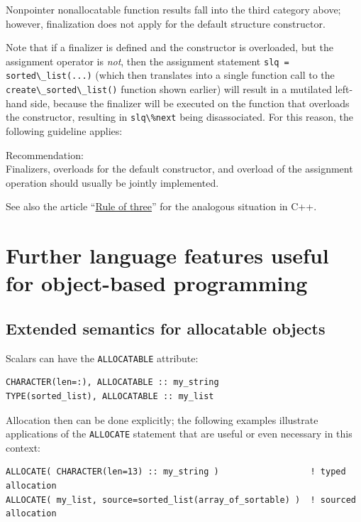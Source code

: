 \documentclass[
  paper=a4,
  ,captions=tableheading
]{scrartcl}
\newcommand{\passthrough}[1]{#1}
\renewenvironment{quote}{\begin{customblockquote}\list{}{\rightmargin=0em\leftmargin=0em}%
\item\relax\color{blockquote-text}\ignorespaces}{\unskip\unskip\endlist\end{customblockquote}}
\begin{document}
Nonpointer nonallocatable function results fall into the third category
above; however, finalization does not apply for the default structure
constructor.

Note that if a finalizer is defined and the constructor is overloaded,
but the assignment operator is \emph{not}, then the assignment statement
\passthrough{\lstinline!slq = sorted\_list(...)!} (which then translates
into a single function call to the
\passthrough{\lstinline!create\_sorted\_list()!} function shown earlier)
will result in a mutilated left-hand side, because the finalizer will be
executed on the function that overloads the constructor, resulting in
\passthrough{\lstinline!slq\%next!} being disassociated. For this
reason, the following guideline applies:

\begin{quote}
Recommendation:\\
Finalizers, overloads for the default constructor, and overload of the
assignment operation should usually be jointly implemented.
\end{quote}

See also the article
``\href{https://en.wikipedia.org/wiki/Rule_of_three_(C\%2B\%2B_programming)}{Rule
of three}'' for the analogous situation in C++.

\section{Further language features useful for object-based
programming}\label{further-language-features-useful-for-object-based-programming}

\subsection{Extended semantics for allocatable
objects}\label{extended-semantics-for-allocatable-objects}

Scalars can have the \passthrough{\lstinline!ALLOCATABLE!} attribute:

\begin{lstlisting}
CHARACTER(len=:), ALLOCATABLE :: my_string
TYPE(sorted_list), ALLOCATABLE :: my_list
\end{lstlisting}

Allocation then can be done explicitly; the following examples
illustrate applications of the \passthrough{\lstinline!ALLOCATE!}
statement that are useful or even necessary in this context:

\begin{lstlisting}
ALLOCATE( CHARACTER(len=13) :: my_string )                  ! typed allocation
ALLOCATE( my_list, source=sorted_list(array_of_sortable) )  ! sourced allocation
\end{lstlisting}
\end{document}
